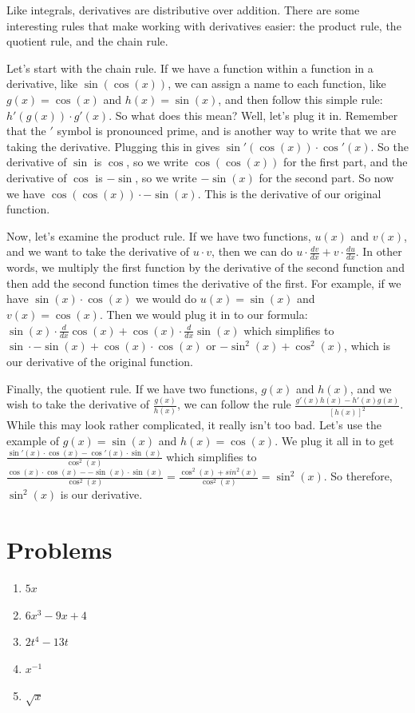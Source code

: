 \documentclass[12pt]{article}
\begin{document}
Like integrals, derivatives are distributive over addition.
There are some interesting rules that make working with derivatives easier: the product rule, the quotient rule, and the chain rule. 

Let's start with the chain rule. 
If we have a function within a function in a derivative, like $\sin(\cos(x))$, we can assign a name to each function, like $g(x) = \cos(x)$ and $h(x) = \sin(x)$, and then follow this simple rule: $h'(g(x)) \cdot g'(x)$. 
So what does this mean? 
Well, let's plug it in. 
Remember that the $'$ symbol is pronounced prime, and is another way to write that we are taking the derivative. 
Plugging this in gives $\sin'(\cos(x)) \cdot \cos'(x)$. 
So the derivative of $\sin$ is $\cos$, so we write $\cos(\cos(x))$ for the first part, and the derivative of $\cos$ is $-\sin$, so we write $-\sin(x)$ for the second part. 
So now we have $\cos(\cos(x)) \cdot -\sin(x)$. 
This is the derivative of our original function.

Now, let's examine the product rule. 
If we have two functions, $u(x)$ and $v(x)$, and we want to take the derivative of $u\cdot v$, then we can do $u \cdot \frac{dv}{dx}+ v\cdot\frac{du}{dx}$. 
In other words, we multiply the first function by the derivative of the second function and then add the second function times the derivative of the first. 
For example, if we have $\sin(x)\cdot\cos(x)$ we would do $u(x) = \sin(x)$ and $v(x) = \cos(x)$. 
Then we would plug it in to our formula: $\sin(x)\cdot\frac{d}{dx}\cos(x) + \cos(x)\cdot\frac{d}{dx}\sin(x)$ which simplifies to $\sin\cdot -\sin(x) + \cos(x)\cdot\cos(x)$ or $-\sin^2(x)+\cos^2(x)$, which is our derivative of the original function.

Finally, the quotient rule. 
If we have two functions, $g(x)$ and $h(x)$, and we wish to take the derivative of $\frac{g(x)}{h(x)}$, we can follow the rule $\frac{g'(x)h(x)-h'(x)g(x)}{[h(x)]^2}$. 
While this may look rather complicated, it really isn't too bad. 
Let's use the example of $g(x) = \sin(x)$ and $h(x) = \cos(x)$. 
We plug it all in to get $\frac{\sin'(x)\cdot\cos(x) -\cos'(x)\cdot\sin(x)}{\cos^2(x)}$
which simplifies to $\frac{\cos(x)\cdot\cos(x)--\sin(x)\cdot\sin(x)}{\cos^2(x)} = \frac{\cos^2(x)+sin^2(x)}{\cos^2(x)} = \sin^2(x)$. 
So therefore, $\sin^2(x)$ is our derivative.
\section{Problems}
\begin{enumerate}
    \item $5x$
    \item $6x^3 - 9x + 4$
    \item $2t^4 - 13t$
    \item $x^{-1}$
    \item $\sqrt{x}$
\end{enumerate}
\end{document}
